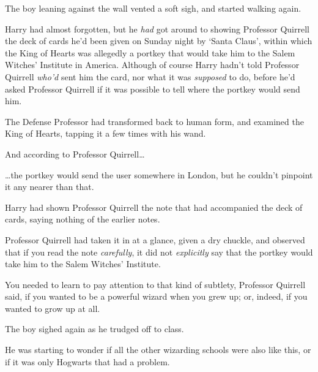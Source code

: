 The boy leaning against the wall vented a soft sigh, and started walking again.

Harry had almost forgotten, but he \emph{had} got around to showing
Professor Quirrell the deck of cards he'd been given on Sunday night by `Santa
Claus', within which the King of Hearts was allegedly a portkey that would take
him to the Salem Witches' Institute in America. Although of course Harry hadn't
told Professor Quirrell \emph{who'd} sent him the card, nor what it was
\emph{supposed} to do, before he'd asked Professor Quirrell if it was possible
to tell where the portkey would send him.

The Defense Professor had transformed back to human form, and examined the King
of Hearts, tapping it a few times with his wand.

And according to Professor Quirrell{\ldots}

{\ldots}the portkey would send the user somewhere in London, but he couldn't
pinpoint it any nearer than that.

Harry had shown Professor Quirrell the note that had accompanied the deck of
cards, saying nothing of the earlier notes.

Professor Quirrell had taken it in at a glance, given a dry chuckle, and
observed that if you read the note \emph{carefully}, it did not
\emph{explicitly} say that the portkey would take him to the Salem Witches'
Institute.

You needed to learn to pay attention to that kind of subtlety, Professor
Quirrell said, if you wanted to be a powerful wizard when you grew up; or,
indeed, if you wanted to grow up at all.

The boy sighed again as he trudged off to class.

He was starting to wonder if all the other wizarding schools were also like
this, or if it was only Hogwarts that had a problem.
